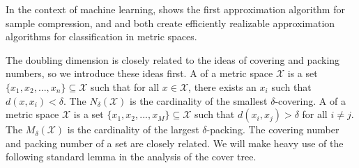 \documentclass[thesis.tex]{subfiles}
\newcommand{\set}[1]{\mathcal {#1}}
\newcommand{\dist}[2]{\distf({#1},{#2})}
\newcommand{\distf}{d}
\begin{document}
In the context of machine learning, \citet{gottlieb2014near} shows the first approximation algorithm for sample compression,
and
\citet{gottlieb2014efficient} and \citet{gottlieb2017efficient} both create efficiently realizable approximation algorithms for classification in metric spaces.


The doubling dimension is closely related to the ideas of covering and packing numbers,
so we introduce these ideas first.
A  of a metric space $\set X$ is a set $\{x_1,x_2,...,x_n\} \subseteq \set X$ such that for all $x\in\set X$, there exists an $x_i$ such that $\dist{x}{x_i} < \delta$.
The  $N_\delta(\set X)$ is the cardinality of the smallest $\delta$-covering.
A  of a metric space $\set X$ is a set $\{x_1,x_2,...,x_M\} \subseteq \set X$ such that $\dist{x_i}{x_j} > \delta$ for all $i \ne j$.
The  $M_\delta (\set X)$ is the cardinality of the largest $\delta$-packing.
The covering number and packing number of a set are closely related.
We will make heavy use of the following standard lemma in the analysis of the cover tree.
\end{document}
